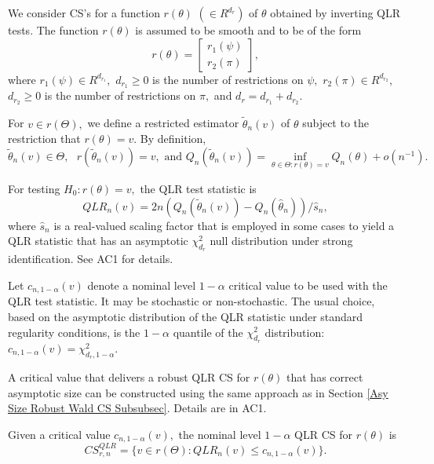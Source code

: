 \documentclass[12pt,thmsb,titlepage,final,oneside,letterpaper]{article}
\begin{document}
We consider CS's for a function $r(\theta )$ $(\in R^{d_{r}})$ of $\theta $
obtained by inverting QLR tests. The function $r(\theta )$ is assumed to be
smooth and to be of the form%
\begin{equation}
r(\theta )=\left[ 
\begin{array}{c}
r_{1}(\psi ) \\ 
r_{2}(\pi )%
\end{array}%
\right] ,  \label{Form of r(theta)}
\end{equation}%
where $r_{1}(\psi )\in R^{d_{r_{1}}},$ $d_{r_{1}}\geq 0$ is the number of
restrictions on $\psi ,$ $r_{2}(\pi )\in R^{d_{r_{2}}},$ $d_{r_{2}}\geq 0$
is the number of restrictions on $\pi ,$ and $d_{r}=d_{r_{1}}+d_{r_{2}}.$

For $v\in r(\Theta ),$ we define a restricted estimator $\widetilde{\theta }%
_{n}(v)$ of $\theta $ subject to the restriction that $r(\theta )=v.$ By
definition, 
\begin{equation}
\widetilde{\theta }_{n}(v)\in \Theta ,\text{ }r(\widetilde{\theta }%
_{n}(v))=v,\text{ and }Q_{n}(\widetilde{\theta }_{n}(v))=\inf_{\theta \in
\Theta :r(\theta )=v}Q_{n}(\theta )+o(n^{-1}).
\end{equation}

For testing $H_{0}:r(\theta )=v,$ the QLR test statistic is%
\begin{equation}
QLR_{n}(v)=2n(Q_{n}(\widetilde{\theta }_{n}(v))-Q_{n}(\widehat{\theta }%
_{n}))/\widehat{s}_{n},  \label{Defn QLR Test Statistic}
\end{equation}%
where $\widehat{s}_{n}$ is a real-valued scaling factor that is employed in
some cases to yield a QLR statistic that has an asymptotic $\chi
_{d_{r}}^{2} $ null distribution under strong identification. See AC1 for
details.

Let $c_{n,1-\alpha }(v)$ denote a nominal level $1-\alpha $ critical value
to be used with the QLR test statistic. It may be stochastic or
non-stochastic. The usual choice, based on the asymptotic distribution of
the QLR statistic under standard regularity conditions, is the $1-\alpha $
quantile of the $\chi _{d_{r}}^{2}$ distribution: $c_{n,1-\alpha }(v)=\chi
_{d_{r},1-\alpha }^{2}.$

A critical value that delivers a robust QLR CS for $r(\theta )$ that has
correct asymptotic size can be constructed using the same approach as in
Section \ref{Asy Size Robust Wald CS Subsubsec}. Details are in AC1.

Given a critical value $c_{n,1-\alpha }(v),$ the nominal level $1-\alpha $
QLR CS for $r(\theta )$ is 
\begin{equation}
CS_{r,n}^{QLR}=\{v\in r(\Theta ):QLR_{n}(v)\leq c_{n,1-\alpha }(v)\}.
\label{Defn of QLR CS}
\end{equation}
\end{document}
